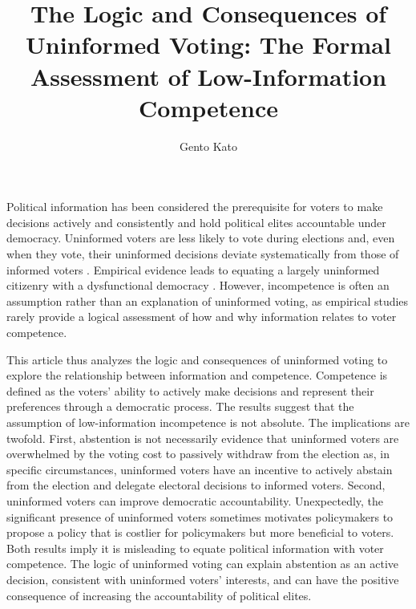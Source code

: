 \documentclass[doc,natbib,12pt]{apa6}
\title{The Logic and Consequences of Uninformed Voting: The Formal Assessment of Low-Information Competence} %
\author{Gento Kato}
\affiliation{University of California, Davis and Waseda University}
\begin{document}
	\maketitle
	
	\par Political information has been considered the prerequisite for voters to make decisions actively and consistently and hold political elites accountable under democracy. Uninformed voters are less likely to vote during elections \citep{Dellicarpini1996wham, Lassen2005thef, Gemenis2014voad} and, even when they vote, their uninformed decisions deviate systematically from those of informed voters \citep{Bartels1996unvo, Fowler2014thpo}. Empirical evidence leads to equating a largely uninformed citizenry with a dysfunctional democracy \citep{Somin1998voig}. However, incompetence is often an assumption rather than an explanation of uninformed voting, as empirical studies rarely provide a logical assessment of how and why information relates to voter competence.
	
	\par This article thus analyzes the logic and consequences of uninformed voting to explore the relationship between information and competence. Competence is defined as the voters' ability to actively make decisions and represent their preferences through a democratic process. The results suggest that the assumption of low-information incompetence is not absolute. The implications are twofold. First, abstention is not necessarily evidence that uninformed voters are overwhelmed by the voting cost to passively withdraw from the election as, in specific circumstances, uninformed voters have an incentive to actively abstain from the election and delegate electoral decisions to informed voters. Second, uninformed voters can improve democratic accountability. Unexpectedly, the significant presence of uninformed voters sometimes motivates policymakers to propose a policy that is costlier for policymakers but more beneficial to voters. Both results imply it is misleading to equate political information with voter competence. The logic of uninformed voting can explain abstention as an active decision, consistent with uninformed voters' interests, and can have the positive consequence of increasing the accountability of political elites.
	
\end{document}
